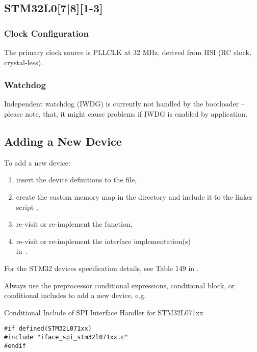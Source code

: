 
\subsection{STM32L0[7|8][1-3]}

\subsubsection{Clock Configuration}
The primary clock source is PLLCLK at 32 MHz, derived from HSI (RC clock, crystal-less).

\subsubsection{Watchdog}
Independent watchdog (IWDG) is currently not handled by the bootloader -- please note, that, it might cause problems if IWDG is enabled by application.


\subsection{Adding a New Device}

To add a new device:
\begin{enumerate}
\item insert the device definitions to the  file, 
\item create the custom memory map in the  directory and include it to the linker script ,
\item re-visit or re-implement the  function,
\item re-visit or re-implement the interface implementation(s)\\in~.
\end{enumerate}

For the STM32 devices specification details, see Table 149 in \cite{STM32:AN2606}.

Always use the preprocessor conditional expressions, conditional block, or conditional includes to add a new device, e.g.  

\begin{docCodeExampleTitled}{Conditional Include of SPI Interface Handler for STM32L071xx}
\begin{verbatim}
#if defined(STM32L071xx) 
#include "iface_spi_stm32l071xx.c"
#endif
\end{verbatim}
\end{docCodeExampleTitled}


